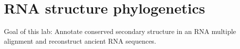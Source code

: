 \chapter{RNA structure phylogenetics}

Goal of this lab:
Annotate conserved secondary structure in an RNA multiple alignment and reconstruct ancient RNA sequences.

